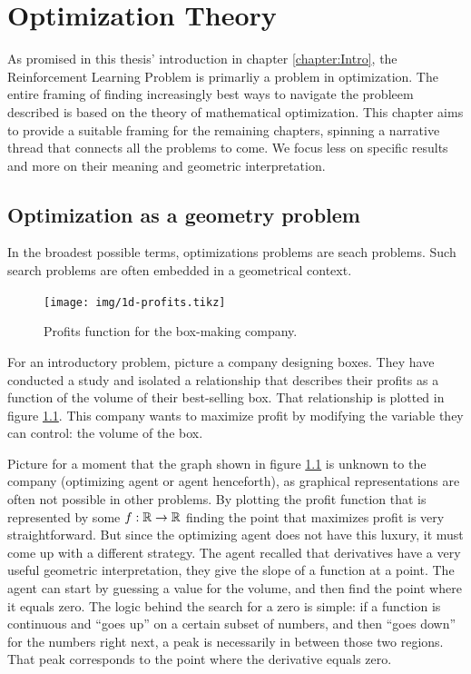 \chapter{Optimization Theory}
\label{chapter:OptimizationTheory}

As promised in this thesis' introduction in chapter \ref{chapter:Intro}, the
Reinforcement Learning Problem is primarliy a problem in optimization. The
entire framing of finding increasingly best ways to navigate the probleem
described is based on the theory of mathematical optimization. This chapter aims
to provide a suitable framing for the remaining chapters, spinning a narrative
thread that connects all the problems to come. We focus less on specific results
and more on their meaning and geometric interpretation.

\section{Optimization as a geometry problem}

In the broadest possible terms, optimizations problems are seach problems. Such
search problems are often embedded in a geometrical context.

\begin{figure}
   \centering
   \texttt{[image: img/1d-profits.tikz]} 
   \caption{Profits function for the box-making company.}
   \label{fig:1d-profits}
\end{figure}

For an introductory problem, picture a company designing boxes. They have
conducted a study and isolated a relationship that describes their profits as a
function of the volume of their best-selling box. That relationship is plotted
in figure \ref{fig:1d-profits}. This company wants to maximize profit by
modifying the variable they can control: the volume of the box.

Picture for a moment that the graph shown in figure \ref{fig:1d-profits} is
unknown to the company (optimizing agent or agent henceforth), as graphical
representations are often not possible in other problems. By plotting the profit
function that is represented by some $f: \mathbb{R} \to \mathbb{R}$ finding the point that
maximizes profit is very straightforward. But since the optimizing agent does
not have this luxury, it must come up with a different strategy. The agent
recalled that derivatives have a very useful geometric interpretation, they give
the slope of a function at a point. The agent can start by guessing a value for
the volume, and then find the point where it equals zero. The logic behind the
search for a zero is simple: if a function is continuous and ``goes up'' on a
certain subset of numbers, and then ``goes down'' for the numbers right next, a
peak is necessarily in between those two regions. That peak corresponds to the
point where the derivative equals zero.

